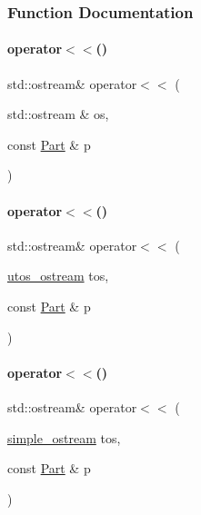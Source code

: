 \subsubsection{Function Documentation}
\mbox{\label{_parts_8cpp_a545350ed97c61e94aefe4fff919dd749}} 
\paragraph{\texorpdfstring{operator$<$$<$()}{operator<<()}\hspace{0.1cm}{\footnotesize\ttfamily [1/40]}}
{\footnotesize\ttfamily std\+::ostream\& operator$<$$<$ (\begin{DoxyParamCaption}\item[{std\+::ostream \&}]{os,  }\item[{const \mbox{\hyperlink{class_part}{Part}} \&}]{p }\end{DoxyParamCaption})}

\mbox{\label{_parts_8cpp_adbf3d6a04840d73851e882509f7a9ac7}} 
\paragraph{\texorpdfstring{operator$<$$<$()}{operator<<()}\hspace{0.1cm}{\footnotesize\ttfamily [2/40]}}
{\footnotesize\ttfamily std\+::ostream\& operator$<$$<$ (\begin{DoxyParamCaption}\item[{\mbox{\hyperlink{structutos__ostream}{utos\+\_\+ostream}}}]{tos,  }\item[{const \mbox{\hyperlink{class_part}{Part}} \&}]{p }\end{DoxyParamCaption})}

\mbox{\label{_parts_8cpp_a784eb7a4c6561272bdbf1d4a46bfb356}} 
\paragraph{\texorpdfstring{operator$<$$<$()}{operator<<()}\hspace{0.1cm}{\footnotesize\ttfamily [3/40]}}
{\footnotesize\ttfamily std\+::ostream\& operator$<$$<$ (\begin{DoxyParamCaption}\item[{\mbox{\hyperlink{structsimple__ostream}{simple\+\_\+ostream}}}]{tos,  }\item[{const \mbox{\hyperlink{class_part}{Part}} \&}]{p }\end{DoxyParamCaption})}

